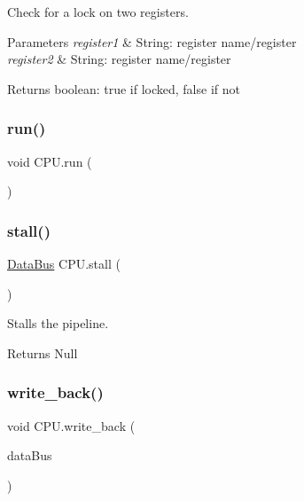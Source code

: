 Check for a lock on two registers.


\begin{DoxyParams}{Parameters}
{\em register1} & String\+: register name/register \\
\hline
{\em register2} & String\+: register name/register \\
\hline
\end{DoxyParams}
\begin{DoxyReturn}{Returns}
boolean\+: true if locked, false if not 
\end{DoxyReturn}
\mbox{\label{class_c_p_u_ad9caa09946940961ed789371a41ad683}} 
\subsubsection{\texorpdfstring{run()}{run()}}
{\footnotesize\ttfamily void C\+P\+U.\+run (\begin{DoxyParamCaption}{ }\end{DoxyParamCaption})\hspace{0.3cm}{\ttfamily [package]}}

\mbox{\label{class_c_p_u_a16848436db7d768084900aaeaa9c0cce}} 
\subsubsection{\texorpdfstring{stall()}{stall()}}
{\footnotesize\ttfamily \mbox{\hyperlink{class_data_bus}{Data\+Bus}} C\+P\+U.\+stall (\begin{DoxyParamCaption}{ }\end{DoxyParamCaption})\hspace{0.3cm}{\ttfamily [private]}}

Stalls the pipeline.

\begin{DoxyReturn}{Returns}
Null 
\end{DoxyReturn}
\mbox{\label{class_c_p_u_a130b9ffccc2c76d5bcc1b30ef5c4a4db}} 
\subsubsection{\texorpdfstring{write\+\_\+back()}{write\_back()}}
{\footnotesize\ttfamily void C\+P\+U.\+write\+\_\+back (\begin{DoxyParamCaption}\item[{\mbox{\hyperlink{class_data_bus}{Data\+Bus}}}]{data\+Bus }\end{DoxyParamCaption})\hspace{0.3cm}{\ttfamily [private]}}



